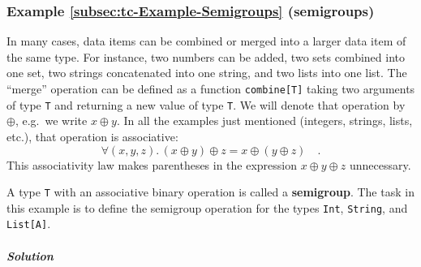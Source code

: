 \subsubsection{Example \label{subsec:tc-Example-Semigroups}\ref{subsec:tc-Example-Semigroups}
(semigroups)}

In many cases, data items can be combined or merged into a larger
data item of the same type. For instance, two numbers can be added,
two sets combined into one set, two strings concatenated into one
string, and two lists into one list. The ``merge'' operation can
be defined as a function \lstinline!combine[T]! taking two arguments
of type \lstinline!T! and returning a new value of type \lstinline!T!.
We will denote that operation by $\oplus$, e.g.~we write $x\oplus y$.
In all the examples just mentioned (integers, strings, lists, etc.),
that operation is associative:
\begin{equation}
\forall(x,y,z).\,\left(x\oplus y\right)\oplus z=x\oplus\left(y\oplus z\right)\quad.\label{eq:associativity-law-semigroup}
\end{equation}
This associativity law makes
parentheses in the expression $x\oplus y\oplus z$ unnecessary.

A type \lstinline!T! with an associative binary operation is called
a \textbf{semigroup}.
The task in this example is to define the semigroup operation for
the types \lstinline!Int!, \lstinline!String!, and \lstinline!List[A]!.

\subparagraph{Solution}

